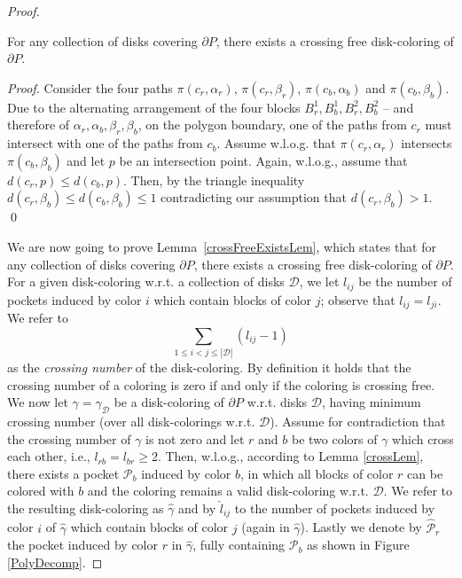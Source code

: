 \documentclass{llncs}
\begin{document}
\begin{proof}
\begin{lemma}
For any collection of disks covering $\partial P$, there exists a crossing free disk-coloring of $\partial P$.
\label{crossFreeExistsLem}
\end{lemma}
\begin{proof}
Consider the four paths $\pi(c_r, \alpha_r)$, $\pi(c_r, \beta_r)$, $\pi(c_b,\alpha_b)$ and $\pi(c_b, \beta_b)$. Due to the alternating arrangement of the four blocks $B^1_r, B^1_b, B^2_r, B^2_b$  -- and therefore of $\alpha_r, \alpha_b, \beta_r, \beta_b$, on the polygon boundary, one of the paths from $c_r$ must intersect with one of the paths from $c_b$.  Assume w.l.o.g. that $\pi(c_r, \alpha_r)$ intersects $\pi(c_b, \beta_b)$ and let $p$ be an intersection point. Again, w.l.o.g., assume that $d(c_r, p) \leq d(c_b, p)$.  Then, by the triangle inequality $d(c_r, \beta_b) \leq d(c_b, \beta_b) \leq 1$ contradicting our assumption that $d(c_r, \beta_b) > 1$.
\qed
\end{proof}


We are now going to prove Lemma~\ref{crossFreeExistsLem}, which states that for any collection of disks covering $\partial P$, there exists a crossing free disk-coloring of $\partial P$.\\

For a given disk-coloring w.r.t. a collection of disks $\mathcal{D}$, we let $l_{ij}$ be the number of pockets induced by color $i$ which contain blocks of color $j$; observe that $l_{ij} = l_{ji}$. We refer to $$\sum_{1 \leq i < j \leq |\mathcal{D}|} (l_{ij} -1) $$ as the \emph{crossing number} of the disk-coloring. By definition it holds that the crossing number of a coloring is zero if and only if the coloring is crossing free. We now let $\gamma = \gamma_{\mathcal{D}}$ be a  disk-coloring of $\partial P$ w.r.t. disks $\mathcal{D}$, having minimum crossing number (over all disk-colorings w.r.t. $\mathcal{D}$). Assume for contradiction that the crossing number of $\gamma$ is not zero and let $r$ and $b$ be two colors of $\gamma$ which cross each other, i.e., $l_{rb} = l_{br} \geq 2$. Then, w.l.o.g., according to Lemma \ref{crossLem}, there exists a pocket  $\mathcal{P}_b$ induced by color $b$, in which all blocks of color $r$ can be colored with $b$ and the coloring remains a valid disk-coloring w.r.t. $\mathcal{D}$. We refer to the resulting disk-coloring as $\hat{\gamma}$ and by $\hat l_{ij}$ to the number of pockets induced by color $i$ of $\hat{\gamma}$ which contain blocks of color $j$ (again in $\hat{\gamma}$). Lastly we denote by $\hat{\mathcal{P}}_r$ the pocket induced by color $r$ in $\hat{\gamma}$, fully containing $\mathcal{P}_b$ as shown in Figure \ref{PolyDecomp}.



\end{proof}
\end{document}
